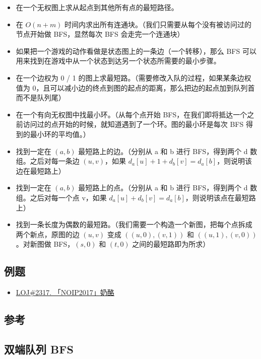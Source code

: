\begin{itemize}
\item 在一个无权图上求从起点到其他所有点的最短路径。
\item 在 $O(n+m)$ 时间内求出所有连通块。（我们只需要从每个没有被访问过的节点开始做 BFS，显然每次 BFS 会走完一个连通块）
\item 如果把一个游戏的动作看做是状态图上的一条边（一个转移），那么 BFS 可以用来找到在游戏中从一个状态到达另一个状态所需要的最小步骤。
\item 在一个边权为 0 / 1 的图上求最短路。（需要修改入队的过程，如果某条边权值为 0，且可以减小边的终点到图的起点的距离，那么把边的起点加到队列首而不是队列尾）
\item 在一个有向无权图中找最小环。（从每个点开始 BFS，在我们即将抵达一个之前访问过的点开始的时候，就知道遇到了一个环。图的最小环是每次 BFS 得到的最小环的平均值。）
\item 找到一定在 $(a, b)$ 最短路上的边。（分别从 a 和 b 进行 BFS，得到两个 d 数组。之后对每一条边 $(u, v)$，如果 $d_a[u]+1+d_b[v]=d_a[b]$，则说明该边在最短路上）
\item 找到一定在 $(a, b)$ 最短路上的点。（分别从 a 和 b 进行 BFS，得到两个 d 数组。之后对每一个点 v，如果 $d_a[u]+d_b[v]=d_a[b]$，则说明该点在最短路上）
\item 找到一条长度为偶数的最短路。（我们需要一个构造一个新图，把每个点拆成两个新点，原图的边 $(u, v)$ 变成 $((u, 0), (v, 1))$ 和 $((u, 1), (v, 0))$。对新图做 BFS，$(s, 0)$ 和 $(t, 0)$ 之间的最短路即为所求）
\end{itemize}

\subsection{例题}

\begin{itemize}
\item \href{https://loj.ac/problem/2317}{LOJ\#2317. 「NOIP2017」奶酪}
\end{itemize}

\subsection{参考}

\href{https://cp-algorithms.com/graph/breadth-first-search.html}{}

\subsection{双端队列 BFS}

